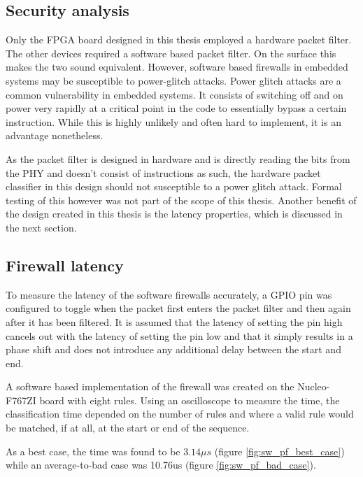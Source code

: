 \subsection{Security analysis}

Only the FPGA board designed in this thesis employed a hardware packet filter. The other devices required a software based packet filter. On the surface this makes the two sound equivalent. However, software based firewalls in embedded systems may be susceptible to power-glitch attacks. Power glitch attacks are a common vulnerability in embedded systems. It consists of switching off and on power very rapidly at a critical point in the code to essentially bypass a certain instruction. While this is highly unlikely and often hard to implement, it is an advantage nonetheless.  

As the packet filter is designed in hardware and is directly reading the bits from the PHY and doesn't consist of instructions as such, the hardware packet classifier in this design should not susceptible to a power glitch attack. Formal testing of this however was not part of the scope of this thesis. Another benefit of the design created in this thesis is the latency properties, which is discussed in the next section. 



\subsection{Firewall latency}

To measure the latency of the software firewalls accurately, a GPIO pin was configured to toggle when the packet first enters the packet filter and then again after it has been filtered. It is assumed that the latency of setting the pin high cancels out with the latency of setting the pin low and that it simply results in a phase shift and does not introduce any additional delay between the start and end. 

A software based implementation of the firewall was created on the Nucleo-F767ZI board with eight rules. Using an oscilloscope to measure the time, the classification time depended on the number of rules and where a valid rule would be matched, if at all, at the start or end of the sequence. 

As a best case, the time was found to be $3.14\mu s$ (figure \ref{fig:sw_pf_best_case}) while an average-to-bad case was 10.76us (figure \ref{fig:sw_pf_bad_case}).



